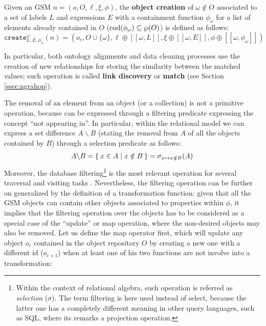 \begin{definition}\label{gsql:objcreate}
	Given an GSM $n=(o,O,\ell,\xi,\phi)$,  the \textbf{object creation} of $\omega\notin O$ associated to a set of labels $L$ and expressions $E$ with a containment function $\phi_\omega$ for a list of elements already contained in $O$ ($\operatorname{cod}(\phi_\omega)\subseteq \wp(O)$) is defined as follows:
	\[\texttt{create}^\omega_{L,E,\phi_\omega}(n)=(o_c,O\cup\{\omega\},\ell\oplus[[\omega, L]],\xi\oplus[[\omega, E]],\phi\oplus[[\omega,\phi_\omega]])\]
\end{definition}

 In particular, both ontology alignments and data cleaning processes \cite{ALIEH17} use the creation of new relationships for storing the similarity between the matched values; such operation is called \textbf{link discovery} or \textbf{match} (see Section \vref{ssec:ngrahop}).

The removal of an element from an object (or a collection) is not a primitive operation, because can be expressed through a filtering predicate expressing the concept ``not appearing in''. In particular, within the relational model we can express a set difference $A\backslash B$ (stating the removal from $A$ of all the objects contained by $B$) through a selection predicate as follows:
\begin{equation}\label{eq:difference}
A\backslash B = \Set{x\in A | x\notin B}=\sigma_{x\mapsto x\notin B}(A)
\end{equation}
Moreover, the  database filtering\footnote{Within the context of relational algebra, such operation is referred as \textit{selection} ($\sigma$). The term filtering is here used instead of select, because the latter one has a completely different meaning in other query languages, such as SQL, where its remarks a projection operation.} is the most relevant operation for several traversal and visiting tasks \cite{ThakkarPAV17,Neo4jAlg,MartonSV17,NautiLOD}. Nevertheless, the filtering operation can be further on generalized by the definition of a transformation function: given that all the GSM objects can contain  other objects associated to properties within $\phi$, it implies that the filtering operation over the objects has to be considered as a special case of the ``update'' or map operation, where the non-desired objects may also be removed.  Let us define the map operator first, which will update any object $o_c$ contained in the object repository $O$ by creating a new one with a different id ($o_{c+1}$) when at least one of his two functions are not involve into a transformation:

